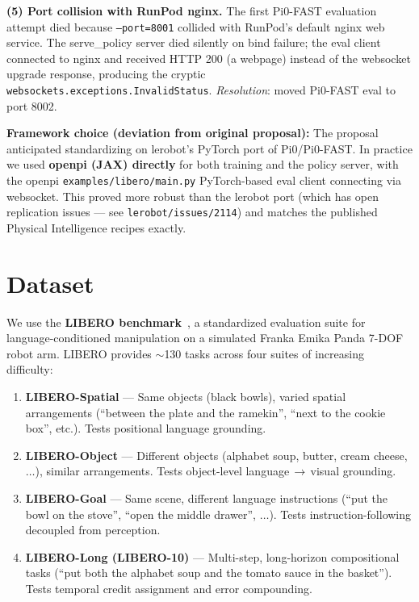 \documentclass[11pt,letterpaper]{article}
\begin{document}
\textbf{(5) Port collision with RunPod nginx.} The first Pi0-FAST evaluation attempt died because \texttt{--port=8001} collided with RunPod's default nginx web service. The serve\_policy server died silently on bind failure; the eval client connected to nginx and received HTTP 200 (a webpage) instead of the websocket upgrade response, producing the cryptic \texttt{websockets.exceptions.InvalidStatus}. \emph{Resolution}: moved Pi0-FAST eval to port 8002.

\begin{callout}
\textbf{Framework choice (deviation from original proposal):} The proposal anticipated standardizing on lerobot's PyTorch port of Pi0/Pi0-FAST. In practice we used \textbf{openpi (JAX) directly} for both training and the policy server, with the openpi \texttt{examples/libero/main.py} PyTorch-based eval client connecting via websocket. This proved more robust than the lerobot port (which has open replication issues --- see \texttt{lerobot/issues/2114}) and matches the published Physical Intelligence recipes exactly.
\end{callout}

\section{Dataset}

We use the \textbf{LIBERO benchmark}~\cite{liu2023libero}, a standardized evaluation suite for language-conditioned manipulation on a simulated Franka Emika Panda 7-DOF robot arm. LIBERO provides $\sim$130 tasks across four suites of increasing difficulty:

\begin{enumerate}[noitemsep,topsep=2pt]
  \item \textbf{LIBERO-Spatial} --- Same objects (black bowls), varied spatial arrangements (``between the plate and the ramekin'', ``next to the cookie box'', etc.). Tests positional language grounding.
  \item \textbf{LIBERO-Object} --- Different objects (alphabet soup, butter, cream cheese, $\dots$), similar arrangements. Tests object-level language\,$\to$\,visual grounding.
  \item \textbf{LIBERO-Goal} --- Same scene, different language instructions (``put the bowl on the stove'', ``open the middle drawer'', $\dots$). Tests instruction-following decoupled from perception.
  \item \textbf{LIBERO-Long (LIBERO-10)} --- Multi-step, long-horizon compositional tasks (``put both the alphabet soup and the tomato sauce in the basket''). Tests temporal credit assignment and error compounding.
\end{enumerate}
\end{document}
